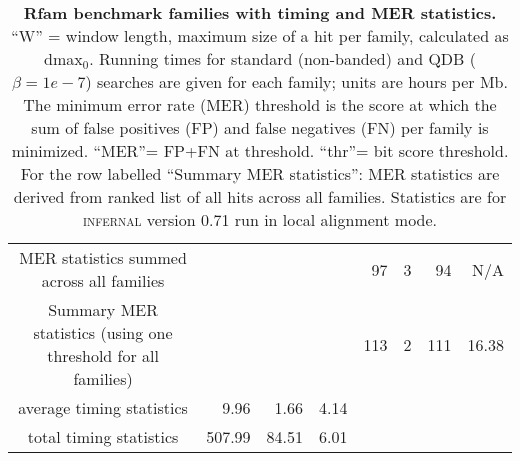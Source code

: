 \begin{table}
\begin{center}
\begin{tabular}{|ll|rr|rr|r|rr|rrrr|}
\multicolumn{6}{|c}{MER statistics summed across all families}                     & \multicolumn{3}{c|}{} & 97 & 3 & 94 & N/A \\  
\multicolumn{6}{|c}{Summary MER statistics (using one threshold for all families)} & \multicolumn{3}{c|}{} & 113 & 2 & 111 &  16.38 \\ \hline
\multicolumn{6}{|c|}{average timing statistics} & 9.96   & 1.66  & 4.14 & \multicolumn{4}{c}{} \\ 
\multicolumn{6}{|c|}{total timing statistics}   & 507.99 & 84.51 & 6.01 & \multicolumn{4}{c}{} \\ \cline{1-9}

\end{tabular}
\end{center}

\caption{\textbf{Rfam benchmark families with timing and MER statistics.}
  ``W'' = window length, maximum size of a hit per family, calculated as dmax$_0$.
  Running times for standard (non-banded) and QDB ($\beta=1e-7$) searches are given for each family; 
  units are hours per Mb. The minimum error rate (MER) threshold is the score at which the sum of false
  positives (FP) and false negatives (FN) per family is
  minimized. ``MER''= FP+FN at threshold. ``thr''= bit score threshold.
  For the row labelled ``Summary MER statistics'': MER statistics are derived from ranked list
  of all hits across all families. Statistics are for \textsc{infernal} version 0.71 run in 
  local alignment mode.}

\label{tbl:rmark}
\end{table}

